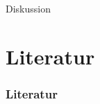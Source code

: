 \section*{}
{

  \begin{frame}
    \centering
    \huge
    Diskussion
  \end{frame}
}

\section{Literatur}
\begin{frame}[allowframebreaks]
  \frametitle{Literatur}
  \makebibliography
\end{frame}
